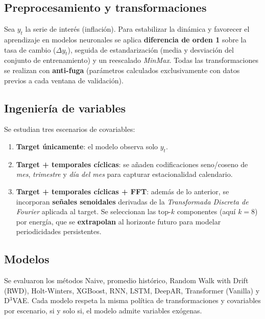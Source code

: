 \documentclass[12pt,letterpaper]{article}
\begin{document}
\subsection{Preprocesamiento y transformaciones}
Sea $y_t$ la serie de interés (inflación). Para estabilizar la dinámica y favorecer el aprendizaje en modelos neuronales se aplica \textbf{diferencia de orden 1} sobre la tasa de cambio (\(\Delta y_t\)), seguida de estandarización (media y desviación del conjunto de entrenamiento) y un reescalado \textit{MinMax}. Todas las transformaciones se realizan con \textbf{anti-fuga} (parámetros calculados exclusivamente con datos previos a cada ventana de validación).

\subsection{Ingeniería de variables}
Se estudian tres escenarios de covariables:
\begin{enumerate}[label=\Alph*.]
    \item \textbf{Target únicamente}: el modelo observa solo \(y_t\).
    \item \textbf{Target + temporales cíclicas}: se añaden codificaciones seno/coseno de \textit{mes}, \textit{trimestre} y \textit{día del mes} para capturar estacionalidad calendario.
    \item \textbf{Target + temporales cíclicas + FFT}: además de lo anterior, se incorporan \textbf{señales senoidales} derivadas de la \textit{Transformada Discreta de Fourier} aplicada al target. Se seleccionan las \(\text{top-}k\) componentes (aquí \(k=8\)) por energía, que se \textbf{extrapolan} al horizonte futuro para modelar periodicidades persistentes.
\end{enumerate}

\subsection{Modelos}
Se evaluaron los métodos Naive, promedio histórico,
Random Walk with Drift (RWD), Holt-Winters,
XGBoost, RNN, LSTM, DeepAR, Transformer
(Vanilla) y D$^3$VAE. Cada modelo respeta la misma política de transformaciones y covariables por escenario, si y solo si, el modelo admite variables exógenas. 
\end{document}
